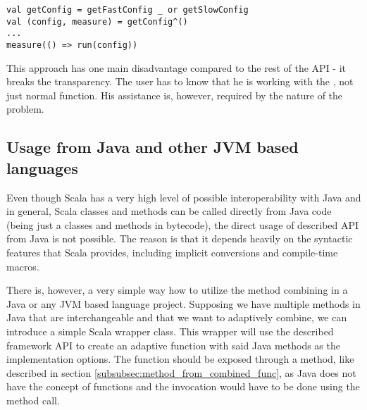\lstset{style=Scala}
\begin{lstlisting}
val getConfig = getFastConfig _ or getSlowConfig
val (config, measure) = getConfig^()
...
measure(() => run(config))
\end{lstlisting}

This approach has one main disadvantage compared to the rest of the API - it breaks the transparency. The user has to know that he is working with the , not just normal function. His assistance is, however, required by the nature of the problem.


\subsection{Usage from Java and other JVM based languages}
\label{subsec:usage_from_java}

Even though Scala has a very high level of possible interoperability with Java and in general, Scala classes and methods can be called directly from Java code (being just a classes and methods in bytecode), the direct usage of described API from Java is not possible. The reason is that it depends heavily on the syntactic features that Scala provides, including implicit conversions and compile-time macros.

There is, however, a very simple way how to utilize the method combining in a Java or any JVM based language project. Supposing we have multiple methods in Java that are interchangeable and that we want to adaptively combine, we can introduce a simple Scala wrapper class. This wrapper will use the described framework API to create an adaptive function with said Java methods as the implementation options. The function should be exposed through a method, like described in section \ref{subsubsec:method_from_combined_func}, as Java does not have the concept of functions and the invocation would have to be done using the  method call.

